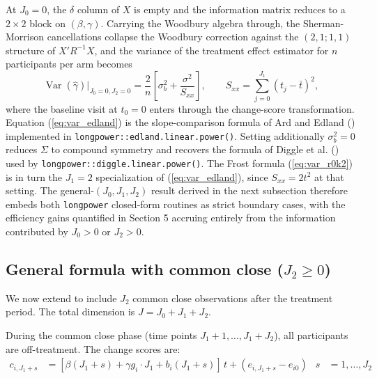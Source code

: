 \documentclass[
  11pt,
]{article}
\begin{document}
At \(J_0 = 0\), the \(\delta\) column of \(X\) is empty and the
information matrix reduces to a \(2 \times 2\) block on
\((\beta, \gamma)\). Carrying the Woodbury algebra through, the
Sherman-Morrison cancellations collapse the Woodbury correction against
the \((2,1; 1,1)\) structure of \(X'R^{-1}X\), and the variance of the
treatment effect estimator for \(n\) participants per arm becomes
\begin{equation}
  \mathop{\mathrm{Var}}(\hat{\gamma})\big|_{J_0=0,J_2=0}
  = \frac{2}{n}\!\left[\sigma_b^2 + \frac{\sigma^2}{S_{xx}}\right],
  \qquad
  S_{xx} = \sum_{j=0}^{J_1}(t_j - \bar t)^2,
  \label{eq:var_edland}
\end{equation} where the baseline visit at \(t_0 = 0\) enters through
the change-score transformation. Equation (\ref{eq:var_edland}) is the
slope-comparison formula of Ard and Edland
() implemented in
\texttt{longpower::edland.linear.power()}. Setting additionally
\(\sigma_b^2 = 0\) reduces \(\Sigma\) to compound symmetry and recovers
the formula of Diggle et al. () used by
\texttt{longpower::diggle.linear.power()}. The Frost formula
(\ref{eq:var_r0k2}) is in turn the \(J_1 = 2\) specialization of
(\ref{eq:var_edland}), since \(S_{xx} = 2t^2\) at that setting. The
general-\((J_0, J_1, J_2)\) result derived in the next subsection
therefore embeds both \texttt{longpower} closed-form routines as strict
boundary cases, with the efficiency gains quantified in Section 5
accruing entirely from the information contributed by \(J_0 > 0\) or
\(J_2 > 0\).

\subsection{\texorpdfstring{General formula with common close
(\(J_2 \ge 0\))}{General formula with common close (J\_2 \textbackslash ge 0)}}\label{general-formula-with-common-close-j_2-ge-0}

We now extend to include \(J_2\) common close observations after the
treatment period. The total dimension is \(J = J_0 + J_1 + J_2\).

During the common close phase (time points \(J_1+1, \ldots,
J_1+J_2\)), all participants are off-treatment. The change scores are:
\begin{align}
  c_{i,J_1+s} &= [\beta(J_1+s) + \gamma g_i \cdot J_1 + b_i(J_1+s)]
    \,t + (e_{i,J_1+s} - e_{i0})
    & s &= 1,\ldots,J_2
\end{align}
\end{document}
